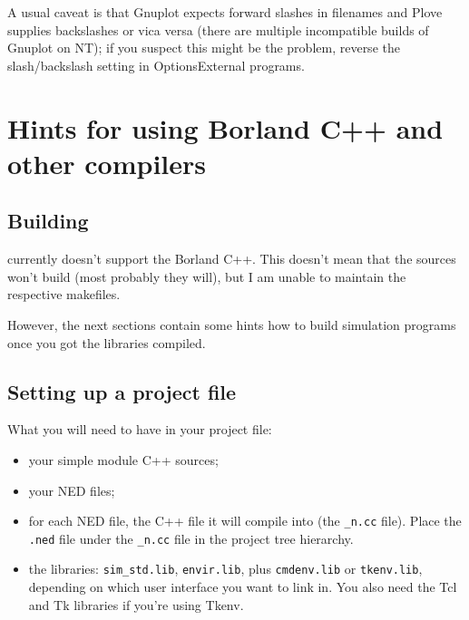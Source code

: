 A usual caveat is that Gnuplot expects forward slashes in filenames
and Plove supplies backslashes or vica versa (there are multiple
incompatible builds of Gnuplot on NT); if you suspect this might be
the problem, reverse the slash/backslash setting in
Options{\textbar}External programs.





\section{Hints for using Borland C++ and other compilers}

\subsection{Building {\opp}}

{\opp} currently doesn't support the Borland C++.
This doesn't mean that the sources won't build (most probably they
will), but I am unable to maintain the respective makefiles.


However, the next sections contain some hints how to build simulation 
programs once you got the libraries compiled.





\subsection{Setting up a project file}

What you will need to have in your project file:
\begin{itemize}
  \item{your simple module C++ sources;}
  \item{your NED files;}
  \item{for each NED file, the C++ file it will compile into (the
      \texttt{\_n.cc} file). Place the \texttt{.ned} file under the
      \texttt{\_n.cc} file in the project tree hierarchy.}
  \item{the {\opp} libraries: \texttt{sim\_std.lib},
      \texttt{envir.lib}, plus \texttt{cmdenv.lib} or
      \texttt{tkenv.lib}, depending on which user interface you want
      to link in. You also need the Tcl and Tk libraries if you're
      using Tkenv.}
\end{itemize}


